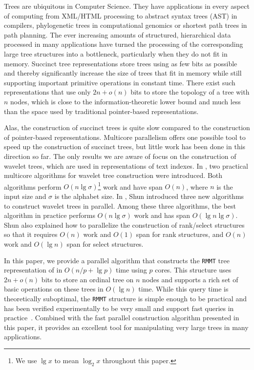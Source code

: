 Trees are ubiquitous in Computer Science.  They have applications in
every aspect of computing from XML/HTML processing to abstract syntax
trees (AST) in compilers, phylogenetic trees in computational genomics
or shortest path trees in path planning.  The ever increasing amounts
of structured, hierarchical data processed in many applications have
turned the processing of the corresponding large tree structures into
a bottleneck, particularly when they do not fit in memory.  Succinct
tree representations store trees using as few bits as possible and
thereby significantly increase the size of trees that fit in memory
while still supporting important primitive operations in constant
time.  There exist such representations that use only $2n + o(n)$
bits to store the topology of a tree with $n$ nodes, which is close
to the information-theoretic lower bound and much less than the space
used by traditional pointer-based representations.

Alas, the construction of succinct trees is quite slow compared to the
construction of pointer-based representations.  Multicore parallelism
offers one possible tool to speed up the construction of succinct
trees, but little work has been done in this direction so far.  The
only results we are aware of focus on the construction of wavelet
trees, which are used in representations of text indexes.  In
\cite{Fuentes2014}, two practical multicore algorithms for wavelet
tree construction were introduced.  Both algorithms perform $O(n\lg
\sigma)$\footnote{We use $\lg x$ to mean $\log_{2}x$ throughout this
paper.} work and have span $O(n)$, where $n$ is the input size and
$\sigma$ is the alphabet size.  In \cite{DBLP:journals/corr/Shun14},
Shun introduced three new algorithms to construct wavelet trees in
parallel. Among these three algorithms, the best algorithm in practice
performs $O(n\lg \sigma)$
work and has span $O(\lg n\lg \sigma)$. Shun also explained how to
parallelize the construction of rank/select structures so that it requires
$O(n)$ work and $O(1)$ span for rank structures, and $O(n)$ work and
$O(\lg n)$ span for select structures.

In this paper, we provide a parallel algorithm that constructs the
{\tt RMMT} tree representation of
\cite{Navarro:2014:FFS:2620785.2601073} in $O(n/p + \lg p)$ time
using $p$ cores.  This structure uses $2n + o(n)$ bits to store an
ordinal tree on $n$ nodes and supports a rich set of basic
operations on these trees in $O(\lg n)$ time.  While this query time
is theoretically suboptimal, the {\tt RMMT} structure is simple enough
to be practical and has been verified experimentally to be very small
and support fast queries in practice~\cite{ACNSalenex10}.  Combined
with the fast parallel construction algorithm presented in this paper,
it provides an excellent tool for manipulating very large trees in
many applications.

